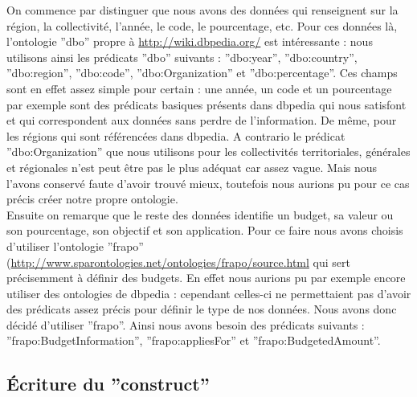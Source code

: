 \documentclass[a4paper,sffamily,12pt]{article}
\begin{document}
			\indent On commence par distinguer que nous avons des données qui renseignent sur la région, la collectivité, l'année, le code, le pourcentage, etc. Pour ces données là, l'ontologie ''dbo'' propre à \url{http://wiki.dbpedia.org/} est intéressante : nous utilisons ainsi les prédicats ''dbo'' suivants : ''dbo:year'', ''dbo:country'', ''dbo:region'', ''dbo:code'', ''dbo:Organization'' et ''dbo:percentage''. Ces champs sont en effet assez simple pour certain : une année, un code et un pourcentage par exemple sont des prédicats basiques présents dans dbpedia qui nous satisfont et qui correspondent aux données sans perdre de l'information. De même, pour les régions qui sont référencées dans dbpedia. A contrario le prédicat ''dbo:Organization'' que nous utilisons pour les collectivités territoriales, générales et régionales n'est peut être pas le plus adéquat car assez vague. Mais nous l'avons conservé faute d'avoir trouvé mieux, toutefois nous aurions pu pour ce cas précis créer notre propre ontologie.  \\ 
		
			\indent Ensuite on remarque que le reste des données identifie un budget, sa valeur ou son pourcentage, son objectif et son application. Pour ce faire nous avons choisis d'utiliser l'ontologie ''frapo'' (\url{http://www.sparontologies.net/ontologies/frapo/source.html} qui sert précisemment à définir des budgets. En effet nous aurions pu par exemple encore utiliser des ontologies de dbpedia : cependant celles-ci ne permettaient pas d'avoir des prédicats assez précis pour définir le type de nos données.  Nous avons donc décidé d'utiliser ''frapo''. Ainsi nous avons besoin des prédicats suivants : ''frapo:BudgetInformation'', ''frapo:appliesFor'' et ''frapo:BudgetedAmount''.
		
			\vspace{0.5cm}
			
		\subsection{Écriture du ''construct''}
			
			\vspace{0.5cm}
		
\end{document}
